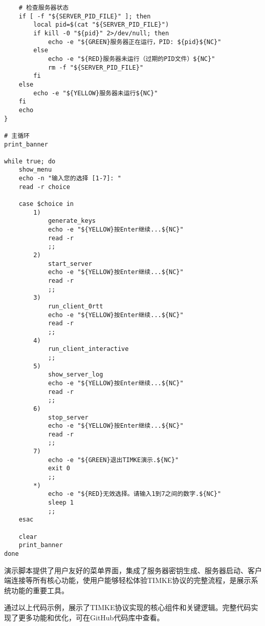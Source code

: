 \begin{verbatim}
    # 检查服务器状态
    if [ -f "${SERVER_PID_FILE}" ]; then
        local pid=$(cat "${SERVER_PID_FILE}")
        if kill -0 "${pid}" 2>/dev/null; then
            echo -e "${GREEN}服务器正在运行，PID: ${pid}${NC}"
        else
            echo -e "${RED}服务器未运行（过期的PID文件）${NC}"
            rm -f "${SERVER_PID_FILE}"
        fi
    else
        echo -e "${YELLOW}服务器未运行${NC}"
    fi
    echo
}

# 主循环
print_banner

while true; do
    show_menu
    echo -n "输入您的选择 [1-7]: "
    read -r choice
    
    case $choice in
        1)
            generate_keys
            echo -e "${YELLOW}按Enter继续...${NC}"
            read -r
            ;;
        2)
            start_server
            echo -e "${YELLOW}按Enter继续...${NC}"
            read -r
            ;;
        3)
            run_client_0rtt
            echo -e "${YELLOW}按Enter继续...${NC}"
            read -r
            ;;
        4)
            run_client_interactive
            ;;
        5)
            show_server_log
            echo -e "${YELLOW}按Enter继续...${NC}"
            read -r
            ;;
        6)
            stop_server
            echo -e "${YELLOW}按Enter继续...${NC}"
            read -r
            ;;
        7)
            echo -e "${GREEN}退出TIMKE演示.${NC}"
            exit 0
            ;;
        *)
            echo -e "${RED}无效选择。请输入1到7之间的数字.${NC}"
            sleep 1
            ;;
    esac
    
    clear
    print_banner
done
\end{verbatim}

演示脚本提供了用户友好的菜单界面，集成了服务器密钥生成、服务器启动、客户端连接等所有核心功能，使用户能够轻松体验TIMKE协议的完整流程，是展示系统功能的重要工具。

通过以上代码示例，展示了TIMKE协议实现的核心组件和关键逻辑。完整代码实现了更多功能和优化，可在GitHub代码库中查看。